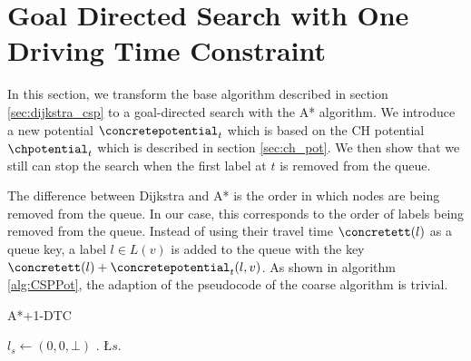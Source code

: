 \section{Goal Directed Search with One Driving Time Constraint}
In this section, we transform the base algorithm described in section \ref{sec:dijkstra_csp} to a goal-directed search with the A* algorithm. We introduce a new potential $\concretepotential_t$ which is based on the CH potential $\chpotential_t$ which is described in section \ref{sec:ch_pot}. We then show that we still can stop the search when the first label at $t$ is removed from the queue.

The difference between Dijkstra and A* is the order in which nodes are being removed from the queue. In our case, this corresponds to the order of labels being removed from the queue. Instead of using their travel time $\concretett(l)$ as a queue key, a label $l \in L(v)$ is added to the queue with the key $\concretett(l) + \concretepotential_t(l,v)$. As shown in algorithm \ref{alg:CSPPot}, the adaption of the pseudocode of the coarse algorithm is trivial.

\begin{algorithm}[bt]
	\caption{\textsc{A*+1-DTC}}\label{alg:CSPPot}

	\DontPrintSemicolon %



	\BlankLine
	$l_s \leftarrow (0,0,\bot)$\;
	\Q.\;
	\L{$s$}.\;
	\BlankLine
	{
		\settleNextNode{}\;

		{
			\Return\;
		}
	}
\end{algorithm}

